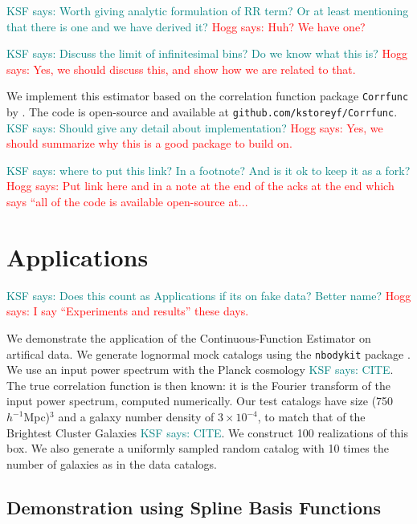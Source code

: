 \documentclass[modern]{aastex62}
\newcommand{\est}{the Continuous-Function Estimator\xspace}
\newcommand{\hmpc}{$h^{-1}$Mpc}
\newcommand{\KSF}[1]{\textcolor{teal}{KSF says: #1}}
\newcommand{\hogg}[1]{\textcolor{red}{Hogg says: #1}}
\begin{document}
\KSF{Worth giving analytic formulation of RR term? Or at least mentioning that there is one and we have derived it?} \hogg{Huh? We have one?}

\KSF{Discuss the limit of infinitesimal bins? Do we know what this is?} \hogg{Yes, we should discuss this, and show how we are related to that.}

We implement this estimator based on the correlation function package \texttt{Corrfunc} by \cite{Sinha2019}.
The code is open-source and available at \texttt{github.com/kstoreyf/Corrfunc}.
\KSF{Should give any detail about implementation?} \hogg{Yes, we should summarize why this is a good package to build on.}

\KSF{where to put this link? In a footnote? And is it ok to keep it as a fork?} \hogg{Put link here and in a note at the end of the acks at the end which says ``all of the code is available open-source at...}

\section{Applications}
\label{sec:app}

\KSF{Does this count as Applications if its on fake data? Better name?} \hogg{I say ``Experiments and results'' these days.}

We demonstrate the application of \est on artifical data.
We generate lognormal mock catalogs \citep{ColesJones1991} using the \texttt{nbodykit} package \citep{Hand2018}.
We use an input power spectrum with the Planck cosmology \KSF{CITE}.
The true correlation function is then known: it is the Fourier transform of the input power spectrum, computed numerically.
Our test catalogs have size (750 \hmpc)$^3$ and a galaxy number density of $3 \times 10^{-4}$, to match that of the Brightest Cluster Galaxies \KSF{CITE}.
We construct 100 realizations of this box. 
We also generate a uniformly sampled random catalog with 10 times the number of galaxies as in the data catalogs.

\subsection{Demonstration using Spline Basis Functions}
\label{sec:spline}
\end{document}

